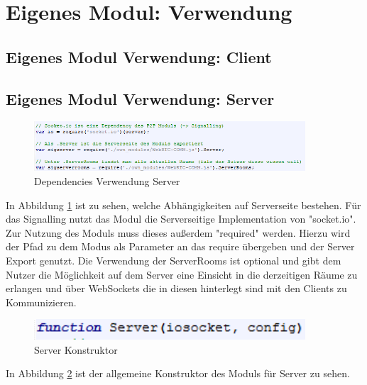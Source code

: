 \begin{description}
\end{description}


\section{Eigenes Modul: Verwendung}

\subsection{Eigenes Modul Verwendung: Client}
\subsection{Eigenes Modul Verwendung: Server}
\begin{figure}[ht]
\centering
\includegraphics[width=0.9\textwidth]{backend/Modul_UserServerDependencies.PNG}
\caption{Dependencies Verwendung Server}
\label{backfig6}
\end{figure}
In Abbildung \ref{backfig6} ist zu sehen, welche Abhängigkeiten auf Serverseite bestehen.
Für das Signalling nutzt das Modul die Serverseitige Implementation von "socket.io". 
Zur Nutzung des Moduls muss dieses außerdem "required" werden. Hierzu wird der Pfad zu dem Modus als Parameter an das require übergeben und der Server Export genutzt.
Die Verwendung der ServerRooms ist optional und gibt dem Nutzer die Möglichkeit auf dem Server eine Einsicht in die derzeitigen Räume zu erlangen und über WebSockets die in diesen hinterlegt sind mit den Clients zu Kommunizieren.

\begin{figure}[ht]
\centering
\includegraphics[width=0.9\textwidth]{backend/Modul_ServerContructor.PNG}
\caption{Server Konstruktor}
\label{backfig7}
\end{figure}
In Abbildung \ref{backfig7} ist der allgemeine Konstruktor des Moduls für Server zu sehen.

